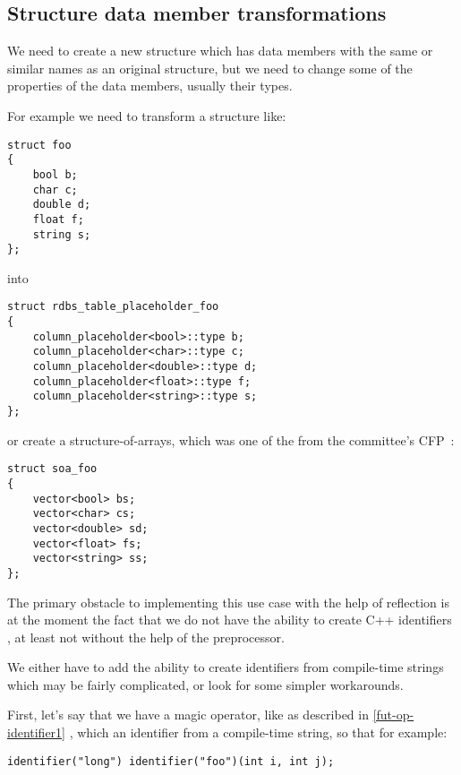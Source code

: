 \subsection{Structure data member transformations}
\label{use-case-struct-transf}

We need to create a new structure which has data members with the same or similar
names as an original structure, but we need to change some of the properties
of the data members, usually their types.

For example we need to transform a structure like:

\begin{verbatim}
struct foo
{
	bool b;
	char c;
	double d;
	float f;
	string s;
};
\end{verbatim}

into

\begin{verbatim}
struct rdbs_table_placeholder_foo
{
	column_placeholder<bool>::type b;
	column_placeholder<char>::type c;
	column_placeholder<double>::type d;
	column_placeholder<float>::type f;
	column_placeholder<string>::type s;
};
\end{verbatim}

or create a structure-of-arrays, which was one of the 
from the committee's CFP~\cite{ISOCPP-N3814}: 

\begin{verbatim}
struct soa_foo
{
	vector<bool> bs;
	vector<char> cs;
	vector<double> sd;
	vector<float> fs;
	vector<string> ss;
};
\end{verbatim}

The primary obstacle to implementing this use case with the help of reflection
is at the moment the fact that we do not have the ability to create C++
identifiers , at least not without the help of
the preprocessor.

We either have to add the ability to create identifiers from compile-time strings
which may be fairly complicated, or look for some simpler workarounds.

First, let's say that we have a magic operator, like \verb@identifier@ as
described in \ref{fut-op-identifier1} , which  an identifier from
a compile-time string, so that for example:

\begin{verbatim}
identifier("long") identifier("foo")(int i, int j);
\end{verbatim}

